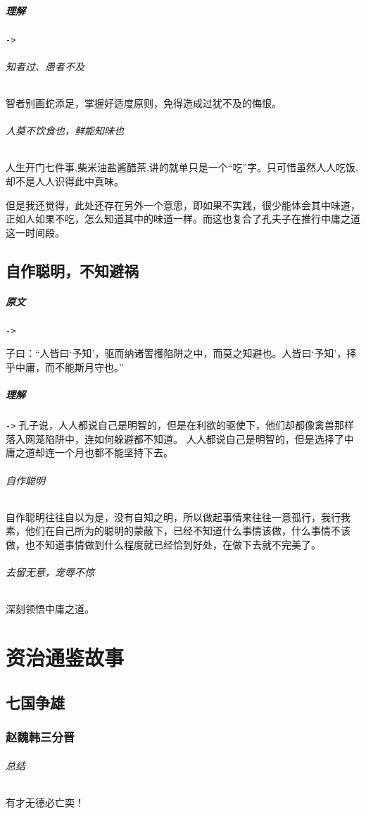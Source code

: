 \documentclass[UTF8,a4paper,8pt]{ctexbook}
\begin{document}
			\paragraph{理解}\verb|->|
			
				\subparagraph{知者过、愚者不及}智者别画蛇添足，掌握好适度原则，免得造成过犹不及的悔恨。
				
				\subparagraph{人莫不饮食也，鲜能知味也} 人生开门七件事,柴米油盐酱醋茶,讲的就单只是一个“吃”字。只可惜虽然人人吃饭,却不是人人识得此中真味。
				
				但是我还觉得，此处还存在另外一个意思，即如果不实践，很少能体会其中味道，正如人如果不吃，怎么知道其中的味道一样。而这也复合了孔夫子在推行中庸之道这一时间段。
	
	\section{自作聪明，不知避祸}
			\paragraph{原文}\verb|->|
					
				子曰：“人皆曰‘予知’，驱而纳诸罟擭陷阱之中，而莫之知避也。人皆曰‘予知’，择乎中庸，而不能斯月守也。”
			\paragraph{理解}\verb|->|
				孔子说，人人都说自己是明智的，但是在利欲的驱使下，他们却都像禽兽那样落入网笼陷阱中，连如何躲避都不知道。
				人人都说自己是明智的，但是选择了中庸之道却连一个月也都不能坚持下去。
			
				
				\subparagraph{自作聪明} 自作聪明往往自以为是，没有自知之明，所以做起事情来往往一意孤行，我行我素，他们在自己所为的聪明的蒙蔽下，已经不知道什么事情该做，什么事情不该做，也不知道事情做到什么程度就已经恰到好处，在做下去就不完美了。
				
				\subparagraph{去留无意，宠辱不惊}深刻领悟中庸之道。	
\chapter{资治通鉴故事}
	\section{七国争雄}
		\subsection{赵魏韩三分晋}
			\subparagraph{总结}有才无德必亡奕！
			
\end{document}
